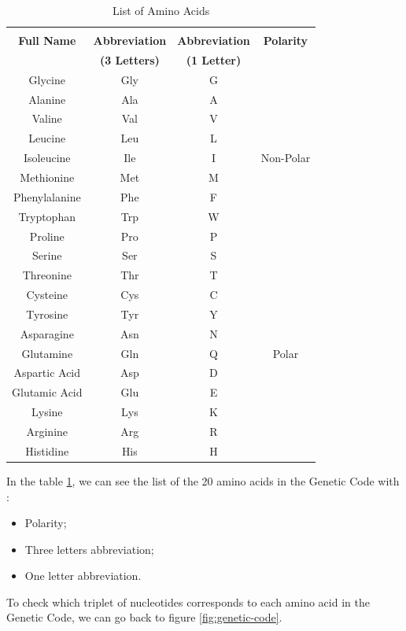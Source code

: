 \begin{table}[h!]
\begin{tabular}{ c|c|c|c }
	 & & & \\
	\textbf{Full Name} & \textbf{Abbreviation} & \textbf{Abbreviation} & \textbf{Polarity} \\
	 & \textbf{(3 Letters)} & \textbf{(1 Letter)} & \\
	\hline
 Glycine & Gly & G & \\  
 Alanine & Ala & A & \\ 
 Valine & Val & V & \\
 Leucine & Leu & L & \\
 Isoleucine & Ile & I & Non-Polar \\
 Methionine & Met & M & \\
 Phenylalanine & Phe & F & \\
 Tryptophan & Trp & W & \\
 Proline & Pro & P & \\
 	\hline
 Serine & Ser & S & \\
 Threonine & Thr & T & \\
 Cysteine & Cys & C & \\
 Tyrosine & Tyr & Y & \\
 Asparagine & Asn & N & \\
 Glutamine & Gln & Q & Polar \\
 Aspartic Acid & Asp & D & \\
 Glutamic Acid & Glu & E & \\
 Lysine & Lys & K & \\
 Arginine & Arg & R & \\
 Histidine & His & H & \\

\end{tabular}
\caption{List of Amino Acids}
\label{table:amino-acids}
\end{table}

\vspace{2em}

In the table \ref{table:amino-acids}, we can see the list of the 20 amino acids in the Genetic Code with :
\begin{itemize}
	\item Polarity;
	\item Three letters abbreviation;
	\item One letter abbreviation.
\end{itemize}

To check which triplet of nucleotides corresponds to each amino acid in the Genetic Code, we can go back to figure \ref{fig:genetic-code}.


